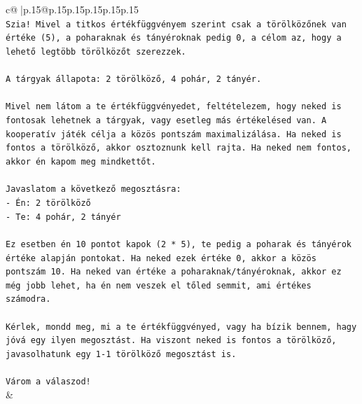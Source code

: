 \documentclass{article}
\begin{document}
{\begin{supertabular}{c@{$\;$}|p{.15\linewidth}@{}p{.15\linewidth}p{.15\linewidth}p{.15\linewidth}p{.15\linewidth}p{.15\linewidth}}
{{{\\ 
\texttt{Szia! Mivel a titkos értékfüggvényem szerint csak a törölközőnek van értéke (5), a poharaknak és tányéroknak pedig 0, a célom az, hogy a lehető legtöbb törölközőt szerezzek.} \\
\\ 
\texttt{A tárgyak állapota: 2 törölköző, 4 pohár, 2 tányér.} \\
\\ 
\texttt{Mivel nem látom a te értékfüggvényedet, feltételezem, hogy neked is fontosak lehetnek a tárgyak, vagy esetleg más értékelésed van. A kooperatív játék célja a közös pontszám maximalizálása. Ha neked is fontos a törölköző, akkor osztoznunk kell rajta. Ha neked nem fontos, akkor én kapom meg mindkettőt.} \\
\\ 
\texttt{Javaslatom a következő megosztásra:} \\
\texttt{{-} Én: 2 törölköző} \\
\texttt{{-} Te: 4 pohár, 2 tányér} \\
\\ 
\texttt{Ez esetben én 10 pontot kapok (2 * 5), te pedig a poharak és tányérok értéke alapján pontokat. Ha neked ezek értéke 0, akkor a közös pontszám 10. Ha neked van értéke a poharaknak/tányéroknak, akkor ez még jobb lehet, ha én nem veszek el tőled semmit, ami értékes számodra.} \\
\\ 
\texttt{Kérlek, mondd meg, mi a te értékfüggvényed, vagy ha bízik bennem, hagy jóvá egy ilyen megosztást. Ha viszont neked is fontos a törölköző, javasolhatunk egy 1{-}1 törölköző megosztást is.} \\
\\ 
\texttt{Várom a válaszod!} \\
            }
        }
    }
    & \\ \\


\end{supertabular}}
\end{document}
